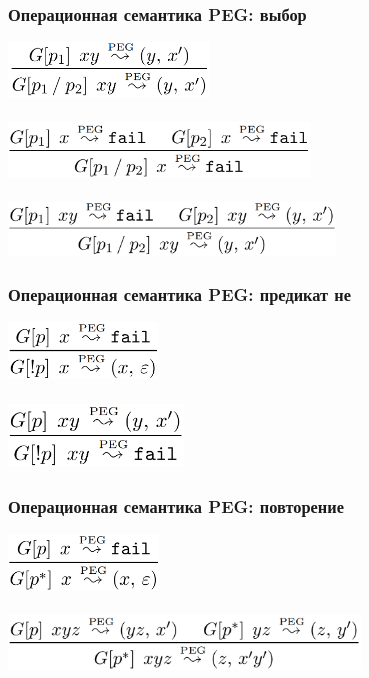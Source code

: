 \documentclass{beamer}
\begin{document}
\begin{frame}[fragile]
  \transwipe[direction=90]
  \frametitle{Операционная семантика PEG: выбор}
\begin{center}
  \includegraphics[width=0.4\textwidth]{pics/ord1}  \\~\\     \pause
  \includegraphics[width=0.6\textwidth]{pics/ord2}  \\~\\     \pause
  \includegraphics[width=0.65\textwidth]{pics/ord3}
\end{center}
\end{frame}

\begin{frame}[fragile]
  \transwipe[direction=90]
  \frametitle{Операционная семантика PEG: предикат не}
\begin{center}
  \includegraphics[width=0.3\textwidth]{pics/not1}  \\~\\     \pause
  \includegraphics[width=0.35\textwidth]{pics/not2} 
\end{center}
\end{frame}

\begin{frame}[fragile]
  \transwipe[direction=90]
  \frametitle{Операционная семантика PEG: повторение}
\begin{center}
  \includegraphics[width=0.3\textwidth]{pics/rep1}  \\~\\     \pause
  \includegraphics[width=0.7\textwidth]{pics/rep2} 
\end{center}
\end{frame}
\end{document}
